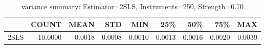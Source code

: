 \begin{table}[ht]
\centering
\caption{variance summary: Estimator=2SLS, Instruments=250, Strength=0.70}
\begin{tabular}{lrrrrrrrr}
\toprule
 & COUNT & MEAN & STD & MIN & 25\% & 50\% & 75\% & MAX \\
\midrule
2SLS & 10.0000 & 0.0018 & 0.0008 & 0.0010 & 0.0013 & 0.0016 & 0.0020 & 0.0039 \\
\bottomrule
\end{tabular}
\end{table}
